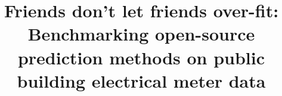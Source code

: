 \documentclass[preprint,12pt]{elsarticle}
\begin{document}
\begin{frontmatter}


\title{Friends don't let friends over-fit: Benchmarking open-source prediction methods on public building electrical meter data}




\address{Building and Urban Data Science (BUDS) Lab, Dept. of Building, School of Design and Environment (SDE), National University of Singapore (NUS)}


\end{frontmatter}
\end{document}

